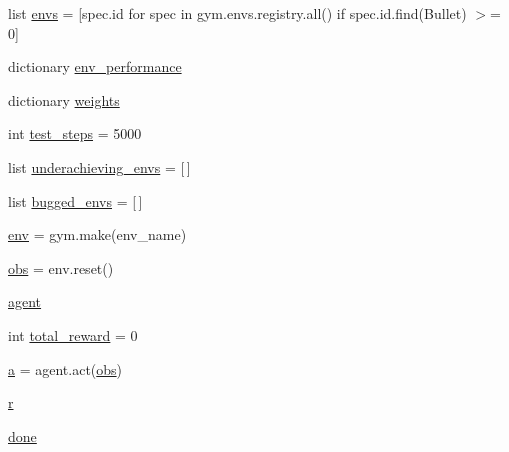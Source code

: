 \begin{DoxyCompactItemize}
\item 
list \hyperlink{namespacepybullet-gym_1_1pybulletgym_1_1tests_1_1test__pybulletgym__roboschool__performance_a06b3fb8e33c9c98f9ab02ae85432b675}{envs} = \mbox{[}spec.\+id for spec in gym.\+envs.\+registry.\+all() if spec.\+id.\+find(\textquotesingle{}Bullet\textquotesingle{}) $>$= 0\mbox{]}
\item 
dictionary \hyperlink{namespacepybullet-gym_1_1pybulletgym_1_1tests_1_1test__pybulletgym__roboschool__performance_a772266aa7f6a3d83ed27eb8094af6dc7}{env\+\_\+performance}
\item 
dictionary \hyperlink{namespacepybullet-gym_1_1pybulletgym_1_1tests_1_1test__pybulletgym__roboschool__performance_a0b2e99d8eaf97a2ec79c583d8b5e40c0}{weights}
\item 
int \hyperlink{namespacepybullet-gym_1_1pybulletgym_1_1tests_1_1test__pybulletgym__roboschool__performance_aed07933768392b16c1858e49300c3e30}{test\+\_\+steps} = 5000
\item 
list \hyperlink{namespacepybullet-gym_1_1pybulletgym_1_1tests_1_1test__pybulletgym__roboschool__performance_ae47d2fc9e704befe6ca4110975aa02c8}{underachieving\+\_\+envs} = \mbox{[}$\,$\mbox{]}
\item 
list \hyperlink{namespacepybullet-gym_1_1pybulletgym_1_1tests_1_1test__pybulletgym__roboschool__performance_af877f9501e640e52828d95fce4b847ed}{bugged\+\_\+envs} = \mbox{[}$\,$\mbox{]}
\item 
\hyperlink{namespacepybullet-gym_1_1pybulletgym_1_1tests_1_1test__pybulletgym__roboschool__performance_a06123b51dce1ba40b65ae6ce455ed991}{env} = gym.\+make(env\+\_\+name)
\item 
\hyperlink{namespacepybullet-gym_1_1pybulletgym_1_1tests_1_1test__pybulletgym__roboschool__performance_acc96171180a13e4f14b21ae44fbf6170}{obs} = env.\+reset()
\item 
\hyperlink{namespacepybullet-gym_1_1pybulletgym_1_1tests_1_1test__pybulletgym__roboschool__performance_a626c643a2a9ca1c69a9779848911a372}{agent}
\item 
int \hyperlink{namespacepybullet-gym_1_1pybulletgym_1_1tests_1_1test__pybulletgym__roboschool__performance_aa2b73ab238a487390f74cfb8c33c0a3c}{total\+\_\+reward} = 0
\item 
\hyperlink{namespacepybullet-gym_1_1pybulletgym_1_1tests_1_1test__pybulletgym__roboschool__performance_ade3b059cf3935b22e270cda8dd71b70f}{a} = agent.\+act(\hyperlink{namespacepybullet-gym_1_1pybulletgym_1_1tests_1_1test__pybulletgym__roboschool__performance_acc96171180a13e4f14b21ae44fbf6170}{obs})
\item 
\hyperlink{namespacepybullet-gym_1_1pybulletgym_1_1tests_1_1test__pybulletgym__roboschool__performance_abc95da0f1455ed55801b9a7acb4a5a51}{r}
\item 
\hyperlink{namespacepybullet-gym_1_1pybulletgym_1_1tests_1_1test__pybulletgym__roboschool__performance_a2f1a4336a613b82c6dcf3c96087432a2}{done}
\end{DoxyCompactItemize}


